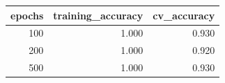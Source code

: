 \begin{tabular}{rrr}
\toprule
epochs & training\_accuracy & cv\_accuracy \\
\midrule
100 & 1.000 & 0.930 \\
200 & 1.000 & 0.920 \\
500 & 1.000 & 0.930 \\
\bottomrule
\end{tabular}
